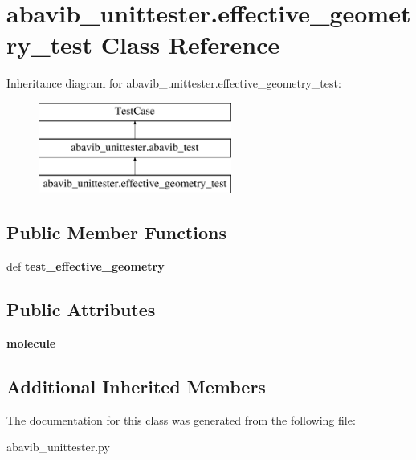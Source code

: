 \hypertarget{classabavib__unittester_1_1effective__geometry__test}{\section{abavib\+\_\+unittester.\+effective\+\_\+geometry\+\_\+test Class Reference}
\label{classabavib__unittester_1_1effective__geometry__test}
}
Inheritance diagram for abavib\+\_\+unittester.\+effective\+\_\+geometry\+\_\+test\+:\begin{figure}[H]
\begin{center}
\leavevmode
\includegraphics[height=3.000000cm]{classabavib__unittester_1_1effective__geometry__test}
\end{center}
\end{figure}
\subsection*{Public Member Functions}
\begin{DoxyCompactItemize}
\item 
\hypertarget{classabavib__unittester_1_1effective__geometry__test_ae467da78c37ec40a981481975b598472}{def {\bfseries test\+\_\+effective\+\_\+geometry}}\label{classabavib__unittester_1_1effective__geometry__test_ae467da78c37ec40a981481975b598472}

\end{DoxyCompactItemize}
\subsection*{Public Attributes}
\begin{DoxyCompactItemize}
\item 
\hypertarget{classabavib__unittester_1_1effective__geometry__test_a11e284ee455dae8ed16cc16b3343ceae}{{\bfseries molecule}}\label{classabavib__unittester_1_1effective__geometry__test_a11e284ee455dae8ed16cc16b3343ceae}

\end{DoxyCompactItemize}
\subsection*{Additional Inherited Members}


The documentation for this class was generated from the following file\+:\begin{DoxyCompactItemize}
\item 
abavib\+\_\+unittester.\+py\end{DoxyCompactItemize}
